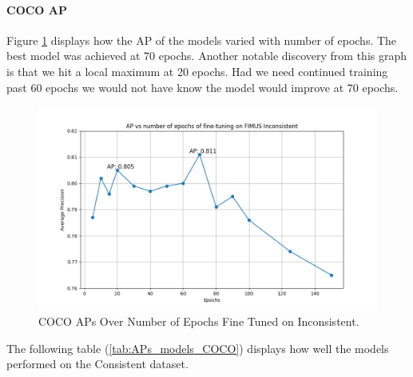 \paragraph{COCO AP}
Figure \ref{fig:plot_AP_COCO} displays how the AP of the models varied with number of epochs. The best model was achieved at 70 epochs. Another notable discovery from this graph is that we hit a local maximum at 20 epochs. Had we need continued training past 60 epochs we would not have know the model would improve at 70 epochs. 

\begin{figure}[H]
    \centering
    \includegraphics[width=\textwidth]{Images/Analytics/plot_AP_coco.png}
    \caption{COCO APs Over Number of Epochs Fine Tuned on Inconsistent.}
    \label{fig:plot_AP_COCO}
\end{figure}

The following table (\ref{tab:APs_models_COCO}) displays how well the models performed on the Consistent dataset. 

